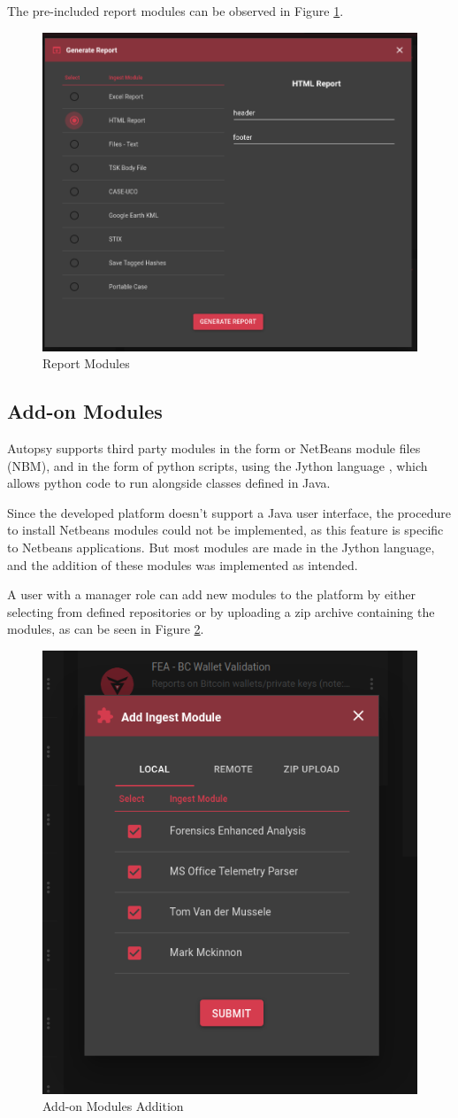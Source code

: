 The pre-included report modules can be observed in Figure \ref{fig:reports}.

\begin{figure}[ht]
 \centering
 \includegraphics[width=0.65\linewidth]{imgs/reports.png}
 \caption{Report Modules}
 \label{fig:reports}
\end{figure}

\subsection{Add-on Modules}

Autopsy supports third party modules in the form or NetBeans \cite{netbeans} module files (NBM), and in the form of python scripts, using the Jython language \cite{jython}, which allows python code to run alongside classes defined in Java.

Since the developed platform doesn't support a Java user interface, the procedure to install Netbeans modules could not be implemented, as this feature is specific to Netbeans applications. 
But most modules are made in the Jython language, and the addition of these modules was implemented as intended.

A user with a manager role can add new modules to the platform by either selecting from defined repositories or by uploading a zip archive containing the modules, as can be seen in Figure \ref{fig:addmodule}.

\begin{figure}[ht]
 \centering
 \includegraphics[width=0.55\linewidth]{imgs/addmodule.png}
 \caption{Add-on Modules Addition}
 \label{fig:addmodule}
\end{figure}

